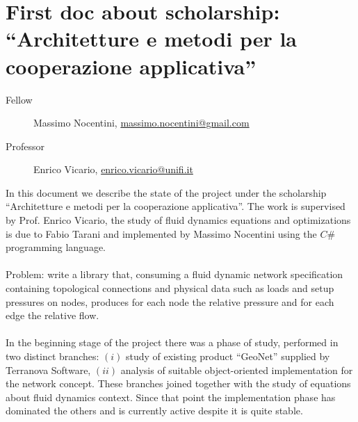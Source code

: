 \documentclass[twoside,openright,titlepage,fleqn,
headinclude,11pt,a4paper,BCOR5mm,footinclude ]{scrbook}
\begin{document}
\frenchspacing
\raggedbottom
{}
\pagestyle{plain}
%
\pagestyle{scrheadings}

\lstset{
	language = java
	, numbers = left 
	, basicstyle=\sffamily%
	, tabsize=2
	, captionpos=b
	, breaklines=true
	, showspaces=false
	, showstringspaces=false
}

\chapter*{First doc about scholarship: ``Architetture e metodi per la 
cooperazione applicativa'' }
\begin{description}
\item[Fellow] Massimo Nocentini, \url{massimo.nocentini@gmail.com}
\item[Professor] Enrico Vicario, \url{enrico.vicario@unifi.it}
\end{description}

In this document we describe the state of the project under the scholarship 
``Architetture e metodi per la cooperazione applicativa''. 
The work is supervised by Prof. Enrico Vicario, the study of
fluid dynamics equations and optimizations is due to Fabio Tarani and
implemented by Massimo Nocentini using the $C\#$ programming language.
\\\\
Problem: write a library that, consuming a fluid dynamic network specification 
containing topological connections and physical data such as loads and
setup pressures on nodes, produces for each node the relative pressure and for
each edge the relative flow.
\\\\
In the beginning stage of the project there was a phase of study, performed in
two distinct branches: $(i)$ study of existing product ``GeoNet'' supplied by
Terranova Software, $(ii)$ analysis of suitable object-oriented implementation
for the network concept. These branches joined together with the study of equations
about fluid dynamics context. Since that point the implementation phase has 
dominated the others and is currently active despite it is quite stable.
\end{document}
